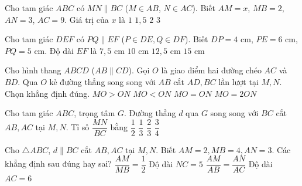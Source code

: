 \begin{ex}%
	Cho tam giác $ABC$ có $MN \parallel BC$ ($M \in AB$, $N \in AC$). Biết $AM = x$, $MB = 2$, $AN = 3$, $AC = 9$. Giá trị của $x$ là
	\choice
	{\True $1$}
	{$1{,}5$}
	{$2$}
	{$3$}
\end{ex}

\begin{ex}%
	Cho tam giác $DEF$ có $PQ \parallel EF$ ($P \in DE, Q \in DF$). Biết $DP = 4\text{ cm}$, $PE = 6\text{ cm}$, $PQ = 5\text{ cm}$. Độ dài $EF$ là
	\choice
	{$7{,}5\text{ cm}$}
	{$10\text{ cm}$}
	{\True $12{,}5\text{ cm}$}
	{$15\text{ cm}$}
\end{ex}

\begin{ex}%
	Cho hình thang $ABCD$ ($AB \parallel CD$). Gọi $O$ là giao điểm hai đường chéo $AC$ và $BD$. Qua $O$ kẻ đường thẳng song song với $AB$ cắt $AD, BC$ lần lượt tại $M, N$. Chọn khẳng định đúng.
	\choice
	{$MO > ON$}
	{$MO < ON$}
	{\True $MO = ON$}
	{$MO = 2ON$}
\end{ex}

\begin{ex}%
	Cho tam giác $ABC$, trọng tâm $G$. Đường thẳng $d$ qua $G$ song song với $BC$ cắt $AB, AC$ tại $M, N$. Tỉ số $\dfrac{MN}{BC}$ bằng
	\choice
	{$\dfrac{1}{2}$}
	{$\dfrac{1}{3}$}
	{\True $\dfrac{2}{3}$}
	{$\dfrac{3}{4}$}
\end{ex}

\begin{ex}%
	Cho $\triangle ABC$, $d \parallel BC$ cắt $AB, AC$ tại $M, N$. Biết $AM=2, MB=4, AN=3$. Các khẳng định sau đúng hay sai?
	\choiceTF
	{\True $\dfrac{AM}{MB} = \dfrac{1}{2}$}
	{Độ dài $NC = 5$}
	{\True $\dfrac{AM}{AB} = \dfrac{AN}{AC}$}
	{Độ dài $AC = 6$}
\end{ex}

